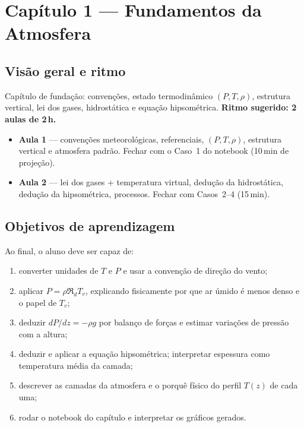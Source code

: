 \section{Capítulo 1 --- Fundamentos da Atmosfera}

\subsection*{Visão geral e ritmo}

Capítulo de fundação: convenções, estado termodinâmico $(P,T,\rho)$,
estrutura vertical, lei dos gases, hidrostática e equação hipsométrica.
\textbf{Ritmo sugerido: 2 aulas de 2\,h.}

\begin{itemize}
  \item \textbf{Aula 1} — convenções meteorológicas, referenciais,
        $(P,T,\rho)$, estrutura vertical e atmosfera padrão.
        Fechar com o Caso~1 do notebook (10\,min de projeção).
  \item \textbf{Aula 2} — lei dos gases + temperatura virtual, dedução da
        hidrostática, dedução da hipsométrica, processos.
        Fechar com Casos~2--4 (15\,min).
\end{itemize}

\subsection*{Objetivos de aprendizagem}

Ao final, o aluno deve ser capaz de:
\begin{enumerate}
  \item converter unidades de $T$ e $P$ e usar a convenção de direção do vento;
  \item aplicar $P=\rho \Re_d T_v$, explicando fisicamente por que ar úmido é
        menos denso e o papel de $T_v$;
  \item deduzir $dP/dz=-\rho g$ por balanço de forças e estimar variações de
        pressão com a altura;
  \item deduzir e aplicar a equação hipsométrica; interpretar espessura como
        temperatura média da camada;
  \item descrever as camadas da atmosfera e o porquê físico do perfil $T(z)$
        de cada uma;
  \item rodar o notebook do capítulo e interpretar os gráficos gerados.
\end{enumerate}

